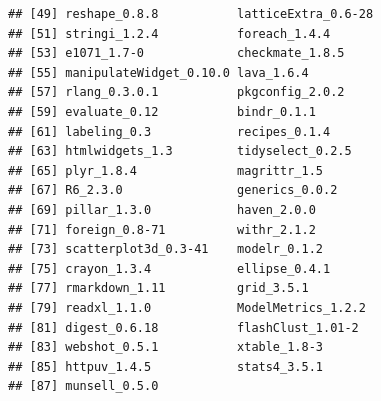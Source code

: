 \documentclass[11pt,]{article}
\begin{document}
\begin{lstlisting}[basicstyle={\ttfamily},basicstyle=\footnotesize]
## [49] reshape_0.8.8           latticeExtra_0.6-28    
## [51] stringi_1.2.4           foreach_1.4.4          
## [53] e1071_1.7-0             checkmate_1.8.5        
## [55] manipulateWidget_0.10.0 lava_1.6.4             
## [57] rlang_0.3.0.1           pkgconfig_2.0.2        
## [59] evaluate_0.12           bindr_0.1.1            
## [61] labeling_0.3            recipes_0.1.4          
## [63] htmlwidgets_1.3         tidyselect_0.2.5       
## [65] plyr_1.8.4              magrittr_1.5           
## [67] R6_2.3.0                generics_0.0.2         
## [69] pillar_1.3.0            haven_2.0.0            
## [71] foreign_0.8-71          withr_2.1.2            
## [73] scatterplot3d_0.3-41    modelr_0.1.2           
## [75] crayon_1.3.4            ellipse_0.4.1          
## [77] rmarkdown_1.11          grid_3.5.1             
## [79] readxl_1.1.0            ModelMetrics_1.2.2     
## [81] digest_0.6.18           flashClust_1.01-2      
## [83] webshot_0.5.1           xtable_1.8-3           
## [85] httpuv_1.4.5            stats4_3.5.1           
## [87] munsell_0.5.0
\end{lstlisting}
\end{document}
